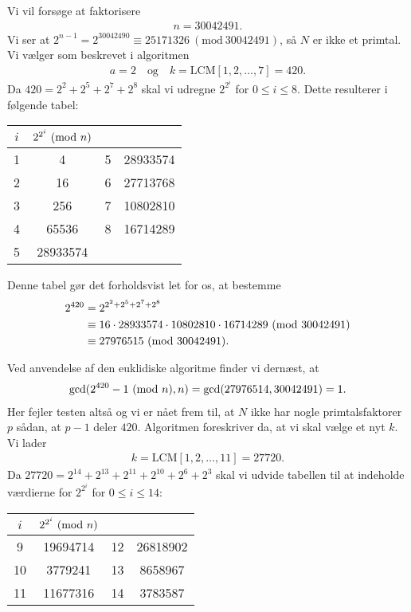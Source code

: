 \begin{example}
Vi vil forsøge at faktorisere 
\begin{align*}
	n = 30042491.
\end{align*}
Vi ser at $2^{n-1} = 2^{30042490} \equiv 25171326 \ (\textrm{mod}\ 30042491)$,
så $N$ er ikke et primtal. Vi vælger som beskrevet i algoritmen
\begin{align*}
	a = 2 \quad \text{og} \quad k = \mathrm{LCM}[1,2, \ldots, 7] = 420.
\end{align*}
Da $420 = 2^2 + 2^5 + 2^7 + 2^8$ skal vi udregne $2^{2^i}$ for 
$0 \leq i \leq 8$. Dette resulterer i følgende tabel:

\begin{center}
\begin{tabular}{c c c c}
$i$ & $2^{2^i} \ (\mathrm{mod} \ n)$ & & \\ 
\hline 
1 & 4 & 5 & 28933574 \\ 
2 & 16 & 6 & 27713768 \\ 
3 & 256 & 7 & 10802810 \\ 
4 & 65536 & 8 & 16714289 \\ 
5 & 28933574 & & 
\end{tabular} 
\end{center}

Denne tabel gør det forholdsvist let for os, at bestemme
\begin{align*}
	2^{420} &= 2^{2^2 + 2^5 + 2^7 + 2^8} \\
	&\equiv 16 \cdot 28933574 \cdot 10802810 \cdot 16714289
	\ (\mathrm{mod} \ 30042491) \\
	&\equiv 27976515 \ (\mathrm{mod} \ 30042491).
\end{align*}

Ved anvendelse af den euklidiske algoritme finder vi dernæst, at
\begin{align*}
	\mathrm{gcd}(2^{420} - 1 \ (\mathrm{mod} \ n), n) = \mathrm{gcd}(27976514, 30042491) = 1.
\end{align*}
Her fejler testen altså og vi er nået frem til, at $N$ ikke har nogle 
primtalsfaktorer $p$ sådan, at $p-1$ deler $420$. Algoritmen foreskriver da, at vi skal vælge et nyt $k$. Vi lader
\begin{align*}
	k = \mathrm{LCM}[1,2, \ldots, 11] = 27720.
\end{align*}
Da $27720 = 2^{14} + 2^{13} + 2^{11} + 2^{10} + 2^{6} + 2^3$ skal vi udvide tabellen til at indeholde værdierne for $2^{2^i}$ for $0 \leq i \leq 14$:

\begin{center}
\begin{tabular}{c c c c}
$i$ & $2^{2^i} \ (\mathrm{mod} \ n)$ & &  \\ 
\hline 
9 & 19694714 & 12 & 26818902 \\ 
10 & 3779241 & 13 & 8658967 \\ 
11 & 11677316 & 14 & 3783587 \\ 
\end{tabular} 
\end{center}


\end{example}
